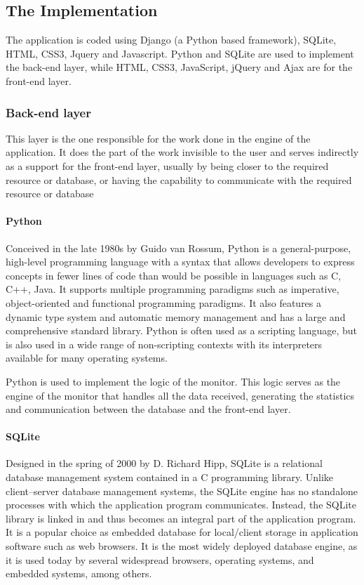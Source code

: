 \documentclass[a4paper]{article}
\begin{document}
\subsection{The Implementation}
The application is coded using Django (a Python based framework), SQLite, HTML, CSS3, Jquery and Javascript. Python and SQLite are used to implement the back-end layer, while HTML, CSS3, JavaScript, jQuery and Ajax are for the front-end layer.

\subsubsection{Back-end layer}
This layer is the one responsible for the work done in the engine of the application. It does the part of the work invisible to the user and serves indirectly as a support for the front-end layer, usually by being closer to the required resource or database, or having the capability to communicate with the required resource or database

\newpage

\paragraph{Python}
Conceived in the late 1980s by Guido van Rossum, Python is a general-purpose, high-level programming language with a syntax that allows developers to express concepts in fewer lines of code than would be possible in languages such as C, C++, Java. It supports multiple programming paradigms such as imperative, object-oriented and functional programming paradigms. It also features a dynamic type system and automatic memory management and has a large and comprehensive standard library. Python is often used as a scripting language, but is also used in a wide range of non-scripting contexts with its interpreters available for many operating systems.

Python is used to implement the logic of the monitor. This logic serves as the engine of the monitor that handles all the data received, generating the statistics and communication between the database and the front-end layer.

\paragraph{SQLite}
Designed in the spring of 2000 by D. Richard Hipp, SQLite is a relational database management system contained in a C programming library. Unlike client–server database management systems, the SQLite engine has no standalone processes with which the application program communicates. Instead, the SQLite library is linked in and thus becomes an integral part of the application program. It is a popular choice as embedded database for local/client storage in application software such as web browsers. It is the most widely deployed database engine, as it is used today by several widespread browsers, operating systems, and embedded systems, among others.
\end{document}

